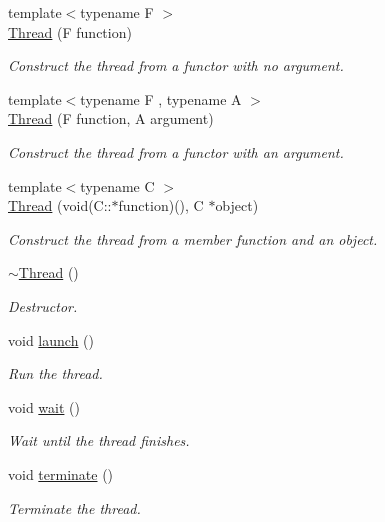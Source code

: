 \begin{DoxyCompactItemize}
\item 
{\footnotesize template$<$typename F $>$ }\\\hyperlink{classsf_1_1_thread_a4cc65399bbb111cf8132537783b8e96c}{Thread} (F function)
\begin{DoxyCompactList}\small\item\em Construct the thread from a functor with no argument. \end{DoxyCompactList}\item 
{\footnotesize template$<$typename F , typename A $>$ }\\\hyperlink{classsf_1_1_thread_a719b2cc067d92d52c35064a49d850a53}{Thread} (F function, A argument)
\begin{DoxyCompactList}\small\item\em Construct the thread from a functor with an argument. \end{DoxyCompactList}\item 
{\footnotesize template$<$typename C $>$ }\\\hyperlink{classsf_1_1_thread_aa9f473c8cbb078900c62b1fd14a83a34}{Thread} (void(C\+::$\ast$function)(), C $\ast$object)
\begin{DoxyCompactList}\small\item\em Construct the thread from a member function and an object. \end{DoxyCompactList}\item 
\hyperlink{classsf_1_1_thread_af77942fc1730af7c31bc4c3a913a9c1d}{$\sim$\+Thread} ()
\begin{DoxyCompactList}\small\item\em Destructor. \end{DoxyCompactList}\item 
void \hyperlink{classsf_1_1_thread_a74f75a9e86e1eb47479496314048b5f6}{launch} ()
\begin{DoxyCompactList}\small\item\em Run the thread. \end{DoxyCompactList}\item 
void \hyperlink{classsf_1_1_thread_a724b1f94c2d54f84280f2f78bde95fa0}{wait} ()
\begin{DoxyCompactList}\small\item\em Wait until the thread finishes. \end{DoxyCompactList}\item 
void \hyperlink{classsf_1_1_thread_ad6b205d4f1ce38b8d44bba0f5501477c}{terminate} ()
\begin{DoxyCompactList}\small\item\em Terminate the thread. \end{DoxyCompactList}\item 

\end{DoxyCompactItemize}
